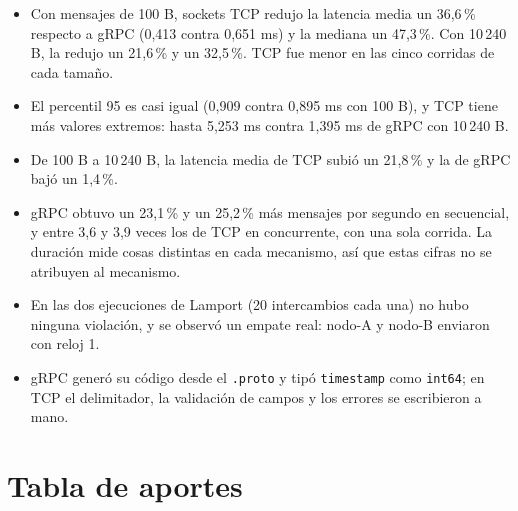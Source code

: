 \documentclass[11pt,a4paper]{article}
\begin{document}
\begin{itemize}
  \item Con mensajes de 100 B, sockets TCP redujo la latencia media un 36,6\,\% respecto a gRPC
        (0,413 contra 0,651 ms) y la mediana un 47,3\,\%. Con 10\,240 B, la redujo un
        21,6\,\% y un 32,5\,\%. TCP fue menor en las cinco corridas de cada tamaño.
  \item El percentil 95 es casi igual (0,909 contra 0,895 ms con 100 B), y TCP tiene más
        valores extremos: hasta 5,253 ms contra 1,395 ms de gRPC con 10\,240 B.
  \item De 100 B a 10\,240 B, la latencia media de TCP subió un 21,8\,\% y la de gRPC bajó un
        1,4\,\%.
  \item gRPC obtuvo un 23,1\,\% y un 25,2\,\% más mensajes por segundo en secuencial, y entre
        3,6 y 3,9 veces los de TCP en concurrente, con una sola corrida. La duración mide
        cosas distintas en cada mecanismo, así que estas cifras no se atribuyen al mecanismo.
  \item En las dos ejecuciones de Lamport (20 intercambios cada una) no hubo ninguna violación,
        y se observó un empate real: nodo-A y nodo-B enviaron con reloj 1.
  \item gRPC generó su código desde el \texttt{.proto} y tipó \texttt{timestamp} como
        \texttt{int64}; en TCP el delimitador, la validación de campos y los errores se
        escribieron a mano.
\end{itemize}

\section{Tabla de aportes}
\end{document}

